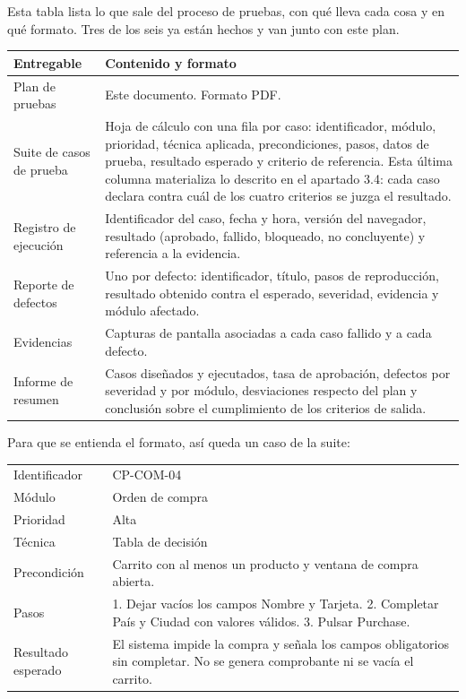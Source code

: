 \documentclass[11pt,a4paper]{article}
\begin{document}
Esta tabla lista lo que sale del proceso de pruebas, con qué lleva cada cosa y en
qué formato. Tres de los seis ya están hechos y van junto con este plan.

\begingroup
\small
\renewcommand{\arraystretch}{1.2}
\begin{center}\small
{}\label{tab:entregables}
\begin{tabularx}{\textwidth}{@{}L{4.2cm} Y@{}}
\toprule
\textbf{Entregable} & \textbf{Contenido y formato} \\
\midrule
Plan de pruebas & Este documento. Formato PDF. \\
Suite de casos de prueba & Hoja de cálculo con una fila por caso: identificador, módulo, prioridad, técnica aplicada, precondiciones, pasos, datos de prueba, resultado esperado y criterio de referencia. Esta última columna materializa lo descrito en el apartado 3.4: cada caso declara contra cuál de los cuatro criterios se juzga el resultado. \\
Registro de ejecución & Identificador del caso, fecha y hora, versión del navegador, resultado (aprobado, fallido, bloqueado, no concluyente) y referencia a la evidencia. \\
Reporte de defectos & Uno por defecto: identificador, título, pasos de reproducción, resultado obtenido contra el esperado, severidad, evidencia y módulo afectado. \\
Evidencias & Capturas de pantalla asociadas a cada caso fallido y a cada defecto. \\
Informe de resumen & Casos diseñados y ejecutados, tasa de aprobación, defectos por severidad y por módulo, desviaciones respecto del plan y conclusión sobre el cumplimiento de los criterios de salida. \\
\bottomrule
\end{tabularx}
\end{center}
\endgroup

Para que se entienda el formato, así queda un caso de la suite:

\begingroup
\small
\renewcommand{\arraystretch}{1.2}
\begin{center}\small
{}
\begin{tabularx}{\textwidth}{@{}L{3.2cm} Y@{}}
\toprule
Identificador & CP-COM-04 \\
Módulo & Orden de compra \\
Prioridad & Alta \\
Técnica & Tabla de decisión \\
Precondición & Carrito con al menos un producto y ventana de compra abierta. \\
Pasos & 1. Dejar vacíos los campos Nombre y Tarjeta. 2. Completar País y Ciudad con valores válidos. 3. Pulsar Purchase. \\
Resultado esperado & El sistema impide la compra y señala los campos obligatorios sin completar. No se genera comprobante ni se vacía el carrito. \\
\bottomrule
\end{tabularx}
\end{center}
\endgroup
\end{document}

